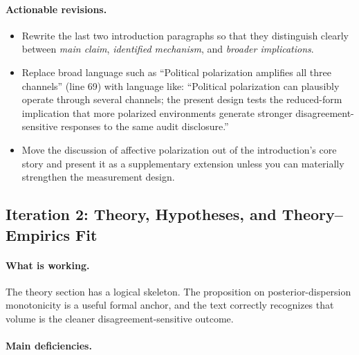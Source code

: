 \documentclass[12pt]{article}
\begin{document}
\paragraph{Actionable revisions.}
\begin{itemize}
    \item Rewrite the last two introduction paragraphs so that they distinguish clearly between \emph{main claim}, \emph{identified mechanism}, and \emph{broader implications}.
    \item Replace broad language such as ``Political polarization amplifies all three channels'' (line 69) with language like: ``Political polarization can plausibly operate through several channels; the present design tests the reduced-form implication that more polarized environments generate stronger disagreement-sensitive responses to the same audit disclosure.''
    \item Move the discussion of affective polarization out of the introduction's core story and present it as a supplementary extension unless you can materially strengthen the measurement design.
\end{itemize}

\subsection*{Iteration 2: Theory, Hypotheses, and Theory--Empirics Fit}

\paragraph{What is working.}
The theory section has a logical skeleton. The proposition on posterior-dispersion monotonicity is a useful formal anchor, and the text correctly recognizes that volume is the cleaner disagreement-sensitive outcome.

\paragraph{Main deficiencies.}
\end{document}
